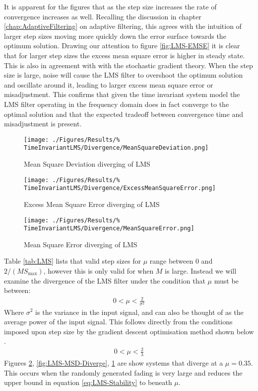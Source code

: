 It is apparent for the figures that as the step size increases the %
rate of convergence increases as well. Recalling the discussion in %
chapter \ref{chap:AdaptiveFiltering} on adaptive filtering, this %
agrees with the intuition of larger step sizes moving more quickly %
down the error surface towards the optimum solution. %
Drawing our attention to figure \ref{fig:LMS-EMSE} it is clear that %
for larger step sizes the excess mean square error is higher %
in steady state. This is also in agreement with with the stochastic %
gradient theory\cite{Hay02}. When the step size is large, noise %
will cause the LMS filter to overshoot the optimum solution %
and oscillate around it, leading to larger excess mean square %
error or misadjustment. This confirms that given the time invariant %
system model the LMS filter operating in the frequency domain does %
in fact converge to the optimal solution and that %
the expected tradeoff between convergence time and misadjustment is %
present.
\begin{figure}[ht]
	\centering
	\begin{minipage}{0.49\textwidth}
		\texttt{[image: ./Figures/Results/\%
		TimeInvariantLMS/Divergence/MeanSquareDeviation.png]}
		\captionsetup{width=0.75\linewidth}
		\caption{Mean Square Deviation diverging of LMS}
		\label{fig:LMS-MSD-Diverge}
	\end{minipage}
	\begin{minipage}{0.49\textwidth}
		\texttt{[image: ./Figures/Results/\%
		TimeInvariantLMS/Divergence/ExcessMeanSquareError.png]}
		\captionsetup{width=0.75\linewidth}
		\caption{Excess Mean Square Error diverging of LMS}
		\label{fig:LMS-EMSE-Diverge}
	\end{minipage}
\end{figure}
\begin{figure}[ht]
	\centering
	\texttt{[image: ./Figures/Results/\%
	TimeInvariantLMS/Divergence/MeanSquareError.png]}
	\captionsetup{width=0.75\linewidth}
	\caption{Mean Square Error diverging of LMS}
	\label{fig:LMS-MSE-Diverge}
\end{figure}
Table \ref{tab:LMS} lists that valid step sizes for $\mu$ range %
between $0$ and $2/(M S_{\text{max}})$, however %
this is only valid for when $M$ is large. Instead we will %
examine the divergence of the LMS filter under the %
condition that $\mu$ must be between:
\begin{align}
	0 < \mu < \frac{2}{\sigma^{2}}
	\label{eq:LMS-Stability}
\end{align}
Where $\sigma^{2}$ is the variance in the input signal, and can also %
be thought of as the average power of the input signal. This follows %
directly from the conditions imposed upon step size by the gradient %
descent optimisation method shown below \cite{Hay02}.
\begin{align}
	0 < \mu < \frac{2}{\lambda}
\end{align}
Figures \ref{fig:LMS-MSE-Diverge}, %
\ref{fig:LMS-MSD-Diverge}, \ref{fig:LMS-EMSE-Diverge} are %
show systems that diverge at a $\mu = 0.35$. This occurs %
when the randomly generated fading is very large and reduces %
the upper bound in equation \ref{eq:LMS-Stability} to beneath %
$\mu$.
\FloatBarrier
